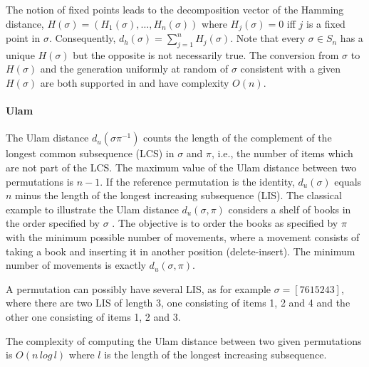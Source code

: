 \documentclass[article,nojss]{jss}
\begin{document}
The notion of fixed points leads to the decomposition vector of the Hamming distance, $H(\sigma) = (H_1(\sigma), \ldots, H_{n}(\sigma))$ where $H_j(\sigma) = 0 $ iff $j$ is a fixed point in $\sigma$. Consequently, $d_h(\sigma) = \sum_{j=1}^{n} H_j(\sigma)$. Note that every $\sigma\in S_n$ has a unique $H(\sigma)$ but the opposite is not necessarily true. The conversion from $\sigma$ to $H(\sigma)$ and the generation uniformly at random of $\sigma$ consistent with a given $H(\sigma)$ are both supported in  and have complexity $O(n)$.

\paragraph{Ulam} 
The Ulam distance $d_u(\sigma\pi^{-1})$ counts the length of the complement of the longest common subsequence (LCS) in $\sigma$ and $\pi$, i.e., the number of items which are not part of the LCS. The maximum value of the Ulam distance between two permutations is $n-1$. If the reference permutation is the identity, $d_u(\sigma)$ equals $n$ minus the length of the longest increasing subsequence (LIS). The classical example to illustrate the Ulam distance $d_u(\sigma, \pi)$ considers a shelf of books in the order specified by $\sigma$ \citep{diaconis88}. The objective is to order the books as specified by $\pi$ with the minimum possible number of movements, where a movement consists of taking a book and inserting it in another position (delete-insert). The minimum number of movements is exactly $d_u(\sigma, \pi)$. 

A permutation can possibly have several LIS, as for example $\sigma = [7615243]$, where there are two LIS of length 3, one consisting of items 1, 2 and 4 and the other one consisting of items 1, 2 and 3. 

The complexity of computing the Ulam distance between two given permutations is $O(n \, log \, l)$ where $l$ is the length of the longest increasing subsequence. 
\end{document}
